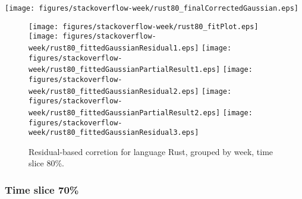 \begin{center}
{\texttt{[image: figures/stackoverflow-week/rust80\_finalCorrectedGaussian.eps]}}
\end{center}

\FloatBarrier

\begin{figure}[t]
\centering
{}
{\texttt{[image: figures/stackoverflow-week/rust80\_fitPlot.eps]}}
{\texttt{[image: figures/stackoverflow-week/rust80\_fittedGaussianResidual1.eps]}}
{\texttt{[image: figures/stackoverflow-week/rust80\_fittedGaussianPartialResult1.eps]}}
{\texttt{[image: figures/stackoverflow-week/rust80\_fittedGaussianResidual2.eps]}}
{\texttt{[image: figures/stackoverflow-week/rust80\_fittedGaussianPartialResult2.eps]}}
{\texttt{[image: figures/stackoverflow-week/rust80\_fittedGaussianResidual3.eps]}}
\caption{Residual-based corretion for language Rust, grouped by week, time slice 80\%.}
\end{figure}


\FloatBarrier


\subsubsection{Time slice 70\%}


